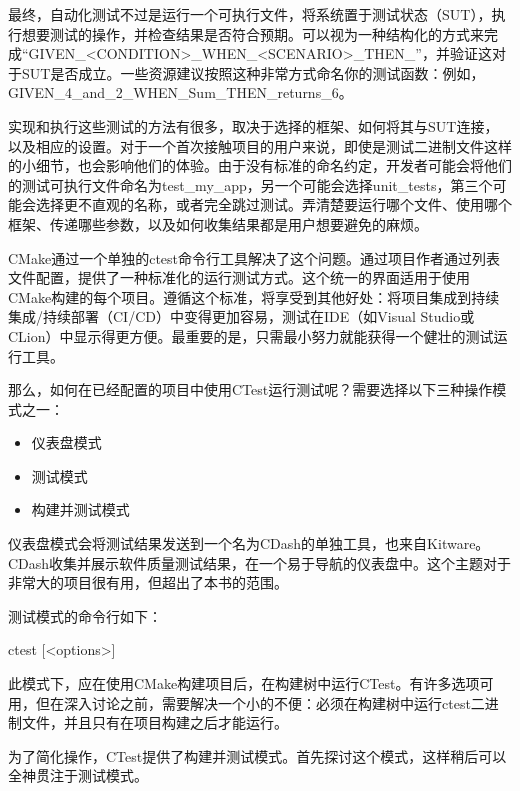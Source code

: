 
最终，自动化测试不过是运行一个可执行文件，将系统置于测试状态（SUT），执行想要测试的操作，并检查结果是否符合预期。可以视为一种结构化的方式来完成“GIVEN\_<CONDITION>\_WHEN\_<SCENARIO>\_THEN\_<EXPECTED-OUTCOME>”，并验证这对于SUT是否成立。一些资源建议按照这种非常方式命名你的测试函数：例如，GIVEN\_4\_and\_2\_WHEN\_Sum\_THEN\_returns\_6。

实现和执行这些测试的方法有很多，取决于选择的框架、如何将其与SUT连接，以及相应的设置。对于一个首次接触项目的用户来说，即使是测试二进制文件这样的小细节，也会影响他们的体验。由于没有标准的命名约定，开发者可能会将他们的测试可执行文件命名为test\_my\_app，另一个可能会选择unit\_tests，第三个可能会选择更不直观的名称，或者完全跳过测试。弄清楚要运行哪个文件、使用哪个框架、传递哪些参数，以及如何收集结果都是用户想要避免的麻烦。

CMake通过一个单独的ctest命令行工具解决了这个问题。通过项目作者通过列表文件配置，提供了一种标准化的运行测试方式。这个统一的界面适用于使用CMake构建的每个项目。遵循这个标准，将享受到其他好处：将项目集成到持续集成/持续部署（CI/CD）中变得更加容易，测试在IDE（如Visual Studio或CLion）中显示得更方便。最重要的是，只需最小努力就能获得一个健壮的测试运行工具。

那么，如何在已经配置的项目中使用CTest运行测试呢？需要选择以下三种操作模式之一：

\begin{itemize}
\item
仪表盘模式

\item
测试模式

\item
构建并测试模式
\end{itemize}

仪表盘模式会将测试结果发送到一个名为CDash的单独工具，也来自Kitware。CDash收集并展示软件质量测试结果，在一个易于导航的仪表盘中。这个主题对于非常大的项目很有用，但超出了本书的范围。

测试模式的命令行如下：

\begin{shell}
ctest [<options>]
\end{shell}

此模式下，应在使用CMake构建项目后，在构建树中运行CTest。有许多选项可用，但在深入讨论之前，需要解决一个小的不便：必须在构建树中运行ctest二进制文件，并且只有在项目构建之后才能运行。

为了简化操作，CTest提供了构建并测试模式。首先探讨这个模式，这样稍后可以全神贯注于测试模式。


